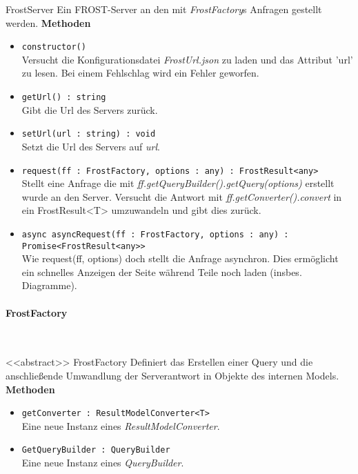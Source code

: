 \begin{Class}{FrostServer}
    Ein FROST-Server an den mit \emph{FrostFactory}s Anfragen gestellt werden.
    \textbf{Methoden}
    \begin{itemize}
        \item \texttt{constructor()}
        \\ Versucht die Konfigurationsdatei \emph{FrostUrl.json} zu laden und das Attribut 'url' zu lesen.
        Bei einem Fehlschlag wird ein Fehler geworfen.
        \item \texttt{getUrl() : string}
        \\ Gibt die Url des Servers zurück.
        \item \texttt{setUrl(url : string) : void}
        \\ Setzt die Url des Servers auf \emph{url}.
        \item \texttt{request(ff : FrostFactory, options : any) : FrostResult<any>}
        \\ Stellt eine Anfrage die mit \emph{ff.getQueryBuilder().getQuery(options)} erstellt wurde an den Server.
        Versucht die Antwort mit \emph{ff.getConverter().convert} in ein FrostResult<T> umzuwandeln und gibt dies zurück.
        \item \texttt{async asyncRequest(ff : FrostFactory, options : any) : Promise<FrostResult<any>>}
        \\ Wie request(ff, options) doch stellt die Anfrage asynchron.
        Dies ermöglicht ein schnelles Anzeigen der Seite während Teile noch laden (insbes. Diagramme).
    \end{itemize}
\end{Class}

\paragraph{FrostFactory}\mbox{}\\

\begin{Class}{<<abstract>> FrostFactory}
    Definiert das Erstellen einer Query und die anschließende Umwandlung der Serverantwort in Objekte des internen Models.
    \textbf{Methoden}
    \begin{itemize}
        \item \texttt{getConverter : ResultModelConverter<T>}
        \\ Eine neue Instanz eines \emph{ResultModelConverter}.
        \item \texttt{GetQueryBuilder : QueryBuilder}
        \\ Eine neue Instanz eines \emph{QueryBuilder}.
    \end{itemize}
\end{Class}

